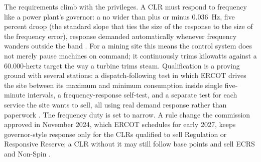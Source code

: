The requirements climb with the privileges. A CLR must respond to frequency like a power plant's governor: a  no wider than plus or minus 0.036~Hz, five percent droop (the standard slope that ties the size of the response to the size of the frequency error), response demanded automatically whenever frequency wanders outside the band \autocite{ercotnog2026}. %
For a mining site this means the control system does not merely pause machines on command; it continuously trims kilowatts against a 60.000-hertz target the way a turbine trims steam. Qualification is a proving ground with several stations: a dispatch-following test in which ERCOT drives the site between its maximum and minimum consumption inside single five-minute intervals, a frequency-response self-test, and a separate test for each service the site wants to sell, all using real demand response rather than paperwork \autocite{ercotclrtest2024}. %
The frequency duty is set to narrow. A rule change the commission approved in November 2024, which ERCOT schedules for early 2027, keeps governor-style response only for the CLRs qualified to sell Regulation or Responsive Reserve; a CLR without it may still follow base points and sell ECRS and Non-Spin \autocite{ercot2024nprr1244,ercotrtcbloadres2025,potomac2026somercot,ercot2026rrprojects}. %
